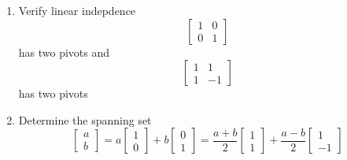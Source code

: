\begin{enumerate}
  \item Verify linear indepdence 
    \[
      \begin{bmatrix} 1 & 0 \\ 0 & 1 \end{bmatrix}
    \] has two pivots and 
    \[
      \begin{bmatrix} 1 & 1 \\ 1 & -1 \end{bmatrix}
    \] has two pivots 
  \item Determine the spanning set 
    \[
      \begin{bmatrix}a \\ b\end{bmatrix} = a\begin{bmatrix}1 \\ 0\end{bmatrix} + 
      b\begin{bmatrix}0 \\ 1\end{bmatrix} = \frac{a+b}{2}\begin{bmatrix}1 \\ 1\end{bmatrix} 
      + \frac{a-b}{2}\begin{bmatrix}1 \\ -1\end{bmatrix}
    \] 

\end{enumerate}
